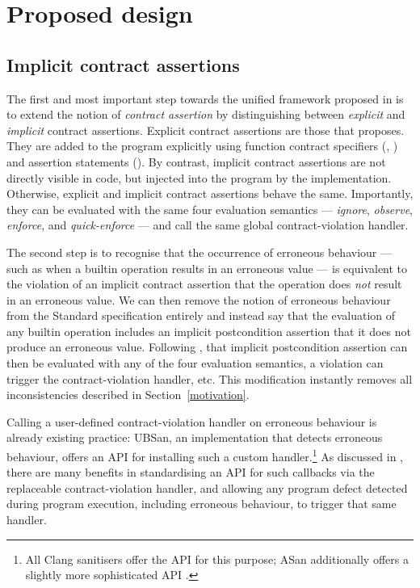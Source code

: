 \section{Proposed design}

\subsection{Implicit contract assertions}

The first  and most important step towards the unified framework proposed in \cite{P3100R1} is to extend the notion of \emph{contract assertion} by distinguishing between \emph{explicit} and \emph{implicit} contract assertions. Explicit contract assertions are those that \cite{P2900R13} proposes. They are added to the program explicitly using function contract specifiers (, ) and assertion statements (\mbox{}). By contrast, implicit contract assertions are not directly visible in code, but injected into the program by the implementation. Otherwise, explicit and implicit contract assertions behave the same. Importantly, they can be evaluated with the same four evaluation semantics --- \emph{ignore}, \emph{observe}, \emph{enforce}, and \emph{quick-enforce} --- and call the same global contract-violation handler. 

The second step is to recognise that the occurrence of erroneous behaviour --- such as when a builtin operation results in an erroneous value --- is equivalent to the violation of an implicit contract assertion that the operation does \emph{not} result in an erroneous value. We can then remove the notion of erroneous behaviour from the Standard specification entirely and instead say that the evaluation of any builtin operation includes an implicit postcondition assertion that it does not produce an erroneous value. Following \cite{P2900R13}, that implicit postcondition assertion can then be evaluated with any of the four evaluation semantics, a violation can trigger the contract-violation handler, etc. This modification instantly removes all inconsistencies described in Section~\ref{motivation}.

Calling a user-defined contract-violation handler on erroneous behaviour is already existing practice: UBSan, an implementation that detects erroneous behaviour, offers an API for installing such a custom handler.\footnote{All Clang sanitisers offer the API  for this purpose; ASan additionally offers a slightly more sophisticated API .} As discussed in \cite{P3100R1}, there are many benefits in standardising an API for such callbacks via the replaceable contract-violation handler, and allowing any program defect detected during program execution, including erroneous behaviour, to trigger that same handler.

